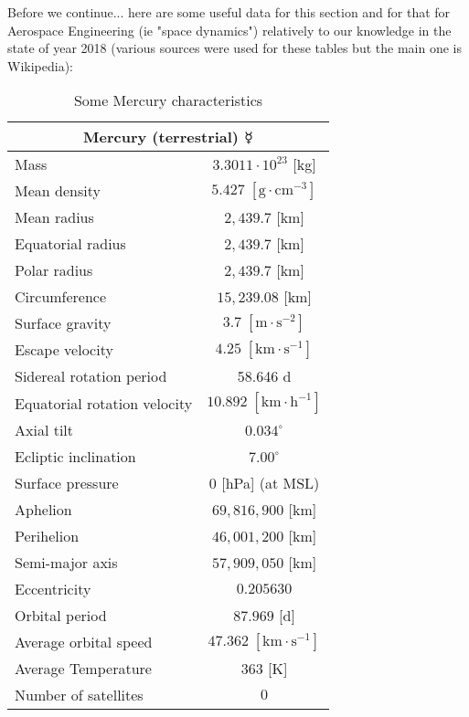 	Before we continue... here are some useful data for this section and for that for Aerospace Engineering (ie "space dynamics") relatively to our knowledge in the state of year 2018 (various sources were used for these tables but the main one is Wikipedia):
	\begin{table}[H]
		\centering
		\begin{tabular}{|l|c|}
		\hline
		\multicolumn{2}{|c|}{\cellcolor[HTML]{9B9B9B}\textbf{Mercury (terrestrial) $\mercury$}} \\ \hline
		Mass & $3.3011\cdot 10^{23}$ {[}kg{]} \\ \hline
		Mean density & $5.427\;[\text{g}\cdot \text{cm}^{-3}]$ \\ \hline
		Mean radius & $2,439.7$ {[}km{]} \\ \hline
		Equatorial radius & $2,439.7$  {[}km{]} \\ \hline
		Polar radius & $2,439.7$ {[}km{]} \\ \hline
		Circumference & $15,239.08$ {[}km{]} \\ \hline
		Surface gravity & $3.7 \; [\text{m}\cdot \text{s}^{-2}]$ \\ \hline
		Escape velocity & $4.25\;[\text{km}\cdot\text{s}^{-1}]$ \\ \hline
		Sidereal rotation period & 58.646 d \\ \hline
		Equatorial rotation velocity & $10.892\;[\text{km}\cdot\text{h}^{-1}]$ \\ \hline
		Axial tilt & $0.034^\circ$ \\ \hline
		Ecliptic inclination & $7.00^\circ$ \\ \hline
		Surface pressure & $0$ {[}hPa{]} (at MSL) \\ \hline
		Aphelion & $69,816,900$ {[}km{]} \\ \hline
		Perihelion & $46,001,200$ {[}km{]} \\ \hline
		Semi-major axis & $57,909,050$ {[}km{]} \\ \hline
		Eccentricity & $0.205630$ \\ \hline
		Orbital period & $87.969 $ {[}d{]} \\ \hline
		Average orbital speed & $47.362\;[\text{km}\cdot\text{s}^{-1}]$ \\ \hline
		Average Temperature & $363$ {[}K{]} \\ \hline
		Number of satellites & $0$ \\ \hline
		\end{tabular}
		\caption{Some Mercury characteristics}
	\end{table}
	
